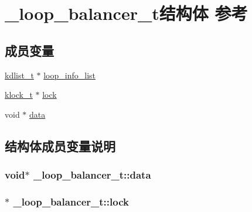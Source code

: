 \hypertarget{a00029}{}\section{\+\_\+loop\+\_\+balancer\+\_\+t结构体 参考}
\label{a00029}
\subsection*{成员变量}
\begin{DoxyCompactItemize}
\item 
\hyperlink{a00066_ae098586334a621a23cef7cb17590b618_ae098586334a621a23cef7cb17590b618}{kdlist\+\_\+t} $\ast$ \hyperlink{a00029_aeff91729503ee321c810ada2ba860cfe_aeff91729503ee321c810ada2ba860cfe}{loop\+\_\+info\+\_\+list}
\item 
\hyperlink{a00066_a4c2f62ab63ab1fd49c71e52bbda0f393_a4c2f62ab63ab1fd49c71e52bbda0f393}{klock\+\_\+t} $\ast$ \hyperlink{a00029_a289429cc01c4a58cce0e07bd05e278ea_a289429cc01c4a58cce0e07bd05e278ea}{lock}
\item 
void $\ast$ \hyperlink{a00029_adf9607bc30dbe281c9cb2f5d1b9aa992_adf9607bc30dbe281c9cb2f5d1b9aa992}{data}
\end{DoxyCompactItemize}


\subsection{结构体成员变量说明}
\hypertarget{a00029_adf9607bc30dbe281c9cb2f5d1b9aa992_adf9607bc30dbe281c9cb2f5d1b9aa992}{}
\subsubsection[{data}]{\setlength{\rightskip}{0pt plus 5cm}void$\ast$ \+\_\+loop\+\_\+balancer\+\_\+t\+::data}\label{a00029_adf9607bc30dbe281c9cb2f5d1b9aa992_adf9607bc30dbe281c9cb2f5d1b9aa992}
\hypertarget{a00029_a289429cc01c4a58cce0e07bd05e278ea_a289429cc01c4a58cce0e07bd05e278ea}{}
\subsubsection[{lock}]{$\ast$ \+\_\+loop\+\_\+balancer\+\_\+t\+::lock}\label{a00029_a289429cc01c4a58cce0e07bd05e278ea_a289429cc01c4a58cce0e07bd05e278ea}
\hypertarget{a00029_aeff91729503ee321c810ada2ba860cfe_aeff91729503ee321c810ada2ba860cfe}{}
